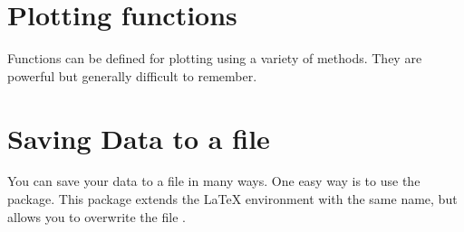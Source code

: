 


\begin{teXXX}
\end{teXXX}



\section*{Plotting functions}
Functions can be defined for plotting using a variety of methods. They are powerful but generally difficult to remember.



\section{Saving Data to a file}

You can save your data to a file in many ways. One easy way is to use
the  package. This package extends the LaTeX environment
with the same name, but allows you to overwrite the file {\protect{}}.

